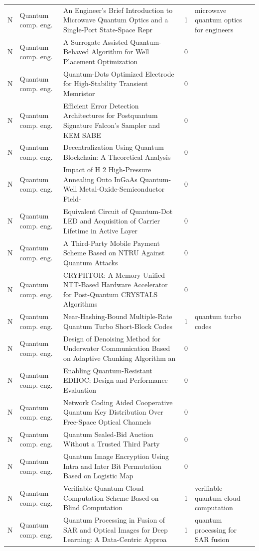 \documentclass[10pt]{article}
\begin{document}
\begin{longtable}{@{}llL{8.6cm}lL{4.2cm}@{}}
N & Quantum comp. eng. & An Engineer's Brief Introduction to Microwave Quantum Optics and a Single-Port State-Space Repr & 1 & microwave quantum optics for engineers \\
N & Quantum comp. eng. & A Surrogate Assisted Quantum-Behaved Algorithm for Well Placement Optimization & 0 &  \\
N & Quantum comp. eng. & Quantum-Dots Optimized Electrode for High-Stability Transient Memristor & 0 &  \\
N & Quantum comp. eng. & Efficient Error Detection Architectures for Postquantum Signature Falcon’s Sampler and KEM SABE & 0 &  \\
N & Quantum comp. eng. & Decentralization Using Quantum Blockchain: A Theoretical Analysis & 0 &  \\
N & Quantum comp. eng. & Impact of H 2 High-Pressure Annealing Onto InGaAs Quantum-Well Metal-Oxide-Semiconductor Field- & 0 &  \\
N & Quantum comp. eng. & Equivalent Circuit of Quantum-Dot LED and Acquisition of Carrier Lifetime in Active Layer & 0 &  \\
N & Quantum comp. eng. & A Third-Party Mobile Payment Scheme Based on NTRU Against Quantum Attacks & 0 &  \\
N & Quantum comp. eng. & CRYPHTOR: A Memory-Unified NTT-Based Hardware Accelerator for Post-Quantum CRYSTALS Algorithms & 0 &  \\
N & Quantum comp. eng. & Near-Hashing-Bound Multiple-Rate Quantum Turbo Short-Block Codes & 1 & quantum turbo codes \\
N & Quantum comp. eng. & Design of Denoising Method for Underwater Communication Based on Adaptive Chunking Algorithm an & 0 &  \\
N & Quantum comp. eng. & Enabling Quantum-Resistant EDHOC: Design and Performance Evaluation & 0 &  \\
N & Quantum comp. eng. & Network Coding Aided Cooperative Quantum Key Distribution Over Free-Space Optical Channels & 0 &  \\
N & Quantum comp. eng. & Quantum Sealed-Bid Auction Without a Trusted Third Party & 0 &  \\
N & Quantum comp. eng. & Quantum Image Encryption Using Intra and Inter Bit Permutation Based on Logistic Map & 0 &  \\
N & Quantum comp. eng. & Verifiable Quantum Cloud Computation Scheme Based on Blind Computation & 1 & verifiable quantum cloud computation \\
N & Quantum comp. eng. & Quantum Processing in Fusion of SAR and Optical Images for Deep Learning: A Data-Centric Approa & 1 & quantum processing for SAR fusion \\

\end{longtable}
\end{document}
